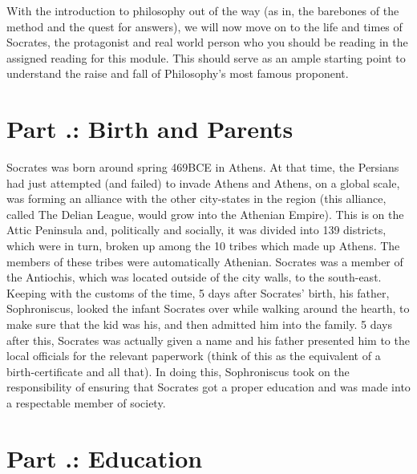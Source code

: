 With the introduction to philosophy out of the way (as in, the barebones of the method and the quest for answers), we will now move on to the life and times of Socrates, the protagonist and real world person who you should be reading in the assigned reading for this module. This should serve as an ample starting point to understand the raise and fall of Philosophy's most famous proponent.
\section{Part \thechapcount.\theseccount: Birth and Parents}

Socrates was born around spring 469BCE in Athens. At that time, the Persians had just attempted  (and failed) to invade Athens and Athens, on a global scale, was forming an alliance with the other city-states in the region (this alliance, called The Delian League, would grow into the Athenian Empire). This is on the Attic Peninsula and, politically and socially, it was divided into 139 districts, which were in turn, broken up among the 10 tribes which made up Athens. The members of these tribes were automatically Athenian. Socrates was a member of the Antiochis, which was located outside of the city walls, to the south-east. Keeping with the customs of the time, 5 days after Socrates' birth, his father, Sophroniscus, looked the infant Socrates over while walking around the hearth, to make sure that the kid was his, and then admitted him into the family. 5 days after this, Socrates was actually given a name and his father presented him to the local officials for the relevant paperwork (think of this as the equivalent of a birth-certificate and all that). In doing this, Sophroniscus took on the responsibility of ensuring that Socrates got a proper education and was made into a respectable member of society.
\section{Part \thechapcount.\theseccount: Education}

